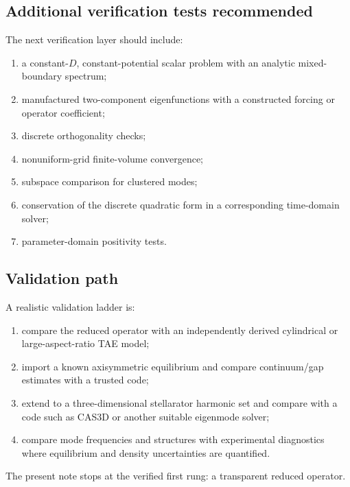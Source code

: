 \subsection{Additional verification tests recommended}
The next verification layer should include:
\begin{enumerate}[leftmargin=1.6em]
\item a constant-$D$, constant-potential scalar problem with an analytic mixed-boundary spectrum;
\item manufactured two-component eigenfunctions with a constructed forcing or operator coefficient;
\item discrete orthogonality checks;
\item nonuniform-grid finite-volume convergence;
\item subspace comparison for clustered modes;
\item conservation of the discrete quadratic form in a corresponding time-domain solver;
\item parameter-domain positivity tests.
\end{enumerate}

\subsection{Validation path}
A realistic validation ladder is:
\begin{enumerate}[leftmargin=1.6em]
\item compare the reduced operator with an independently derived cylindrical or large-aspect-ratio TAE model;
\item import a known axisymmetric equilibrium and compare continuum/gap estimates with a trusted code;
\item extend to a three-dimensional stellarator harmonic set and compare with a code such as CAS3D or another suitable eigenmode solver;
\item compare mode frequencies and structures with experimental diagnostics where equilibrium and density uncertainties are quantified.
\end{enumerate}
The present note stops at the verified first rung: a transparent reduced operator.
